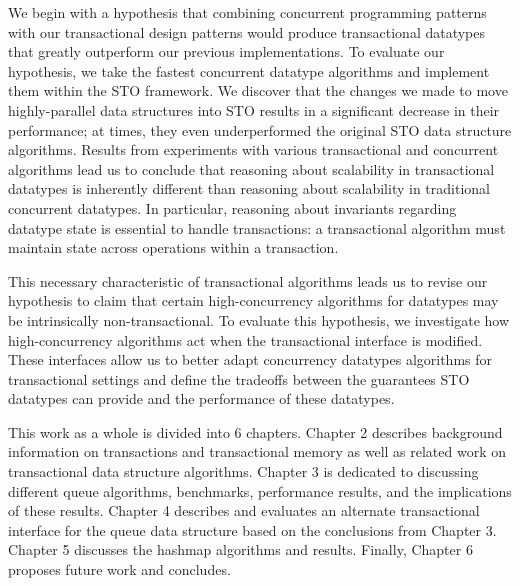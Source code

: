 We begin with a hypothesis that combining concurrent programming patterns with our transactional design patterns would produce transactional datatypes that greatly outperform our previous implementations. To evaluate our hypothesis, we take the fastest concurrent datatype algorithms and implement them within the STO framework. We discover that the changes we made to move highly-parallel data structures into STO results in a significant decrease in their performance; at times, they even underperformed the original STO data structure algorithms. Results from experiments with various transactional and concurrent algorithms lead us to conclude that reasoning about scalability in transactional datatypes is inherently different than reasoning about scalability in traditional concurrent datatypes. In particular, reasoning about invariants regarding datatype state is essential to handle transactions: a transactional algorithm must maintain state across operations within a transaction. 

This necessary characteristic of transactional algorithms leads us to revise our hypothesis to claim that certain high-concurrency algorithms for datatypes may be intrinsically non-transactional. To evaluate this hypothesis, we investigate how high-concurrency algorithms act when the transactional interface is modified. These interfaces allow us to better adapt concurrency datatypes algorithms for transactional settings and define the tradeoffs between the guarantees STO datatypes can provide and the performance of these datatypes.

This work as a whole is divided into 6 chapters. Chapter 2 describes background information on transactions and transactional memory as well as related work on transactional data structure algorithms. Chapter 3 is dedicated to discussing different queue algorithms, benchmarks, performance results, and the implications of these results. Chapter 4 describes and evaluates an alternate transactional interface for the queue data structure based on the conclusions from Chapter 3. Chapter 5 discusses the hashmap algorithms and results. Finally, Chapter 6 proposes future work and concludes.


